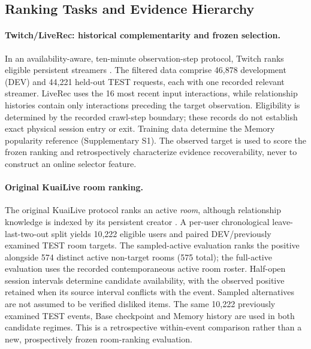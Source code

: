 \subsection{Ranking Tasks and Evidence Hierarchy}
\label{sec:exp-data}

\paragraph{Twitch/LiveRec: historical complementarity and frozen selection.}
In an availability-aware, ten-minute observation-step protocol, Twitch ranks eligible persistent streamers \cite{rappaz2021liverec}. The filtered data comprise 46,878 development (DEV) and 44,221 held-out TEST requests, each with one recorded relevant streamer. LiveRec uses the 16 most recent input interactions, while relationship histories contain only interactions preceding the target observation. Eligibility is determined by the recorded crawl-step boundary; these records do not establish exact physical session entry or exit. Training data determine the Memory popularity reference (Supplementary S1). The observed target is used to score the frozen ranking and retrospectively characterize evidence recoverability, never to construct an online selector feature.

\paragraph{Original KuaiLive room ranking.}
The original KuaiLive protocol ranks an active \emph{room}, although relationship knowledge is indexed by its persistent creator \cite{qu2026kuailive}. A per-user chronological leave-last-two-out split yields 10,222 eligible users and paired DEV/previously examined TEST room targets. The sampled-active evaluation ranks the positive alongside 574 distinct active non-target rooms (575 total); the full-active evaluation uses the recorded contemporaneous active room roster. Half-open session intervals determine candidate availability, with the observed positive retained when its source interval conflicts with the event. Sampled alternatives are not assumed to be verified disliked items. The same 10,222 previously examined TEST events, Base checkpoint and Memory history are used in both candidate regimes. This is a retrospective within-event comparison rather than a new, prospectively frozen room-ranking evaluation.

